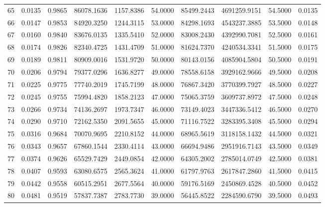 \documentclass[11pt]{article}
\begin{document}
\begin{tabular}{|r|r|r|r|r|r|r|r|r|r|}
65 & 0.0135 & 0.9865 &  86078.1636 & 1157.8386 &  54.0000 & 85499.2443 &  4691259.9151 &  54.5000 & 0.0135 \\
66 & 0.0147 & 0.9853 &  84920.3250 & 1244.3115 &  53.0000 & 84298.1693 &  4543237.3885 &  53.5000 & 0.0148 \\
67 & 0.0160 & 0.9840 &  83676.0135 & 1335.5410 &  52.0000 & 83008.2430 &  4392990.7081 &  52.5000 & 0.0161 \\
68 & 0.0174 & 0.9826 &  82340.4725 & 1431.4709 &  51.0000 & 81624.7370 &  4240534.3341 &  51.5000 & 0.0175 \\
69 & 0.0189 & 0.9811 &  80909.0016 & 1531.9720 &  50.0000 & 80143.0156 &  4085904.5804 &  50.5000 & 0.0191 \\
70 & 0.0206 & 0.9794 &  79377.0296 & 1636.8277 &  49.0000 & 78558.6158 &  3929162.9666 &  49.5000 & 0.0208 \\
71 & 0.0225 & 0.9775 &  77740.2019 & 1745.7199 &  48.0000 & 76867.3420 &  3770399.7927 &  48.5000 & 0.0227 \\
72 & 0.0245 & 0.9755 &  75994.4820 & 1858.2123 &  47.0000 & 75065.3759 &  3609737.8972 &  47.5000 & 0.0248 \\
73 & 0.0266 & 0.9734 &  74136.2697 & 1973.7347 &  46.0000 & 73149.4023 &  3447336.5412 &  46.5000 & 0.0270 \\
74 & 0.0290 & 0.9710 &  72162.5350 & 2091.5655 &  45.0000 & 71116.7522 &  3283395.3408 &  45.5000 & 0.0294 \\
75 & 0.0316 & 0.9684 &  70070.9695 & 2210.8152 &  44.0000 & 68965.5619 &  3118158.1432 &  44.5000 & 0.0321 \\
76 & 0.0343 & 0.9657 &  67860.1544 & 2330.4114 &  43.0000 & 66694.9486 &  2951916.7143 &  43.5000 & 0.0349 \\
77 & 0.0374 & 0.9626 &  65529.7429 & 2449.0854 &  42.0000 & 64305.2002 &  2785014.0749 &  42.5000 & 0.0381 \\
78 & 0.0407 & 0.9593 &  63080.6575 & 2565.3624 &  41.0000 & 61797.9763 &  2617847.2860 &  41.5000 & 0.0415 \\
79 & 0.0442 & 0.9558 &  60515.2951 & 2677.5564 &  40.0000 & 59176.5169 &  2450869.4528 &  40.5000 & 0.0452 \\
80 & 0.0481 & 0.9519 &  57837.7387 & 2783.7730 &  39.0000 & 56445.8522 &  2284590.6790 &  39.5000 & 0.0493 \\
	\hline
\end{tabular}
\end{document}
